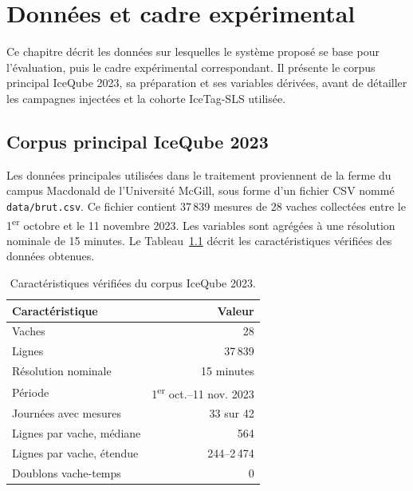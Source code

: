 \chapter{Données et cadre expérimental}
\label{chapitre:donnees}

Ce chapitre décrit les données sur lesquelles le système proposé se base pour l'évaluation,
puis le cadre expérimental correspondant. Il présente le corpus principal IceQube 2023, sa
préparation et ses variables dérivées, avant de détailler les campagnes injectées et la
cohorte IceTag-SLS utilisée.

\section{Corpus principal IceQube 2023}
\label{sec:donnees}

Les données principales utilisées dans le traitement proviennent de la ferme du campus
Macdonald de l'Université McGill, sous forme d'un fichier CSV nommé
\texttt{data/brut.csv}. Ce fichier contient 37\,839 mesures de 28 vaches collectées entre le
1\textsuperscript{er} octobre et le 11 novembre 2023. Les variables sont agrégées à une
résolution nominale de 15 minutes. Le Tableau~\ref{tab:dataset} décrit les
caractéristiques vérifiées des données obtenues.

\begin{table}[H]
  \centering
  \caption{Caractéristiques vérifiées du corpus IceQube 2023.}
  \label{tab:dataset}
  \small
  \begin{tabular}{lr}
    \toprule
    Caractéristique & Valeur \\
    \midrule
    Vaches & 28 \\
    Lignes & 37\,839 \\
    Résolution nominale & 15 minutes \\
    Période & 1\textsuperscript{er} oct.--11 nov. 2023 \\
    Journées avec mesures & 33 sur 42 \\
    Lignes par vache, médiane & 564 \\
    Lignes par vache, étendue & 244--2\,474 \\
    Doublons vache-temps & 0 \\
    \bottomrule
  \end{tabular}
\end{table}

